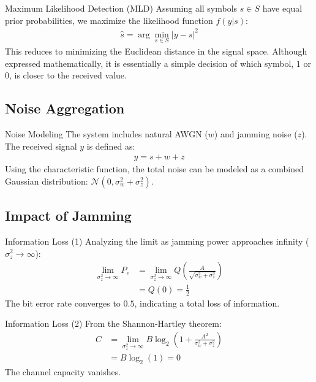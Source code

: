 \documentclass[11pt, aspectratio=169]{beamer}
\begin{document}
\begin{frame}{Maximum Likelihood Detection (MLD)}
  Assuming all symbols $s \in S$ have equal prior probabilities, we maximize the likelihood function $f(y|s)$:
  \begin{align*}
    \hat{s} = \arg \min \limits_{s \in S} |y - s|^2
  \end{align*}
  This reduces to minimizing the Euclidean distance in the signal space. Although expressed mathematically, it is essentially a simple decision of which symbol, $1$ or $0$, is closer to the received value.
\end{frame}

\subsection{Noise Aggregation}

\begin{frame}{Noise Modeling}
  The system includes natural AWGN ($w$) and jamming noise ($z$). The received signal $y$ is defined as:
  \begin{align*}
    y = s + w + z
  \end{align*}
  Using the characteristic function, the total noise can be modeled as a combined Gaussian distribution: $\mathcal{N}(0, \sigma_w^2 + \sigma_z^2)$.
\end{frame}

\subsection{Impact of Jamming}

\begin{frame}{Information Loss (1)}
  Analyzing the limit as jamming power approaches infinity ($\sigma_z^2 \rightarrow \infty$):
  \begin{align*}
    \lim \limits_{\sigma_z^2 \rightarrow \infty} P_e &= \lim \limits_{\sigma_z^2 \rightarrow \infty} Q \left( \frac{A}{\sqrt{\sigma_w^2 + \sigma_z^2}} \right) \\
    &= Q(0) = \frac{1}{2}
  \end{align*}
  The bit error rate converges to $0.5$, indicating a total loss of information.
\end{frame}

\begin{frame}{Information Loss (2)}
  From the Shannon-Hartley theorem:
  \begin{align*}
    C &= \lim \limits_{\sigma_z^2 \rightarrow \infty} B \log_2 \left(1 + \frac{A^2}{\sigma_w^2 + \sigma_z^2} \right) \\
    &= B \log_2(1) = 0
  \end{align*}
  The channel capacity vanishes.
\end{frame}
\end{document}
